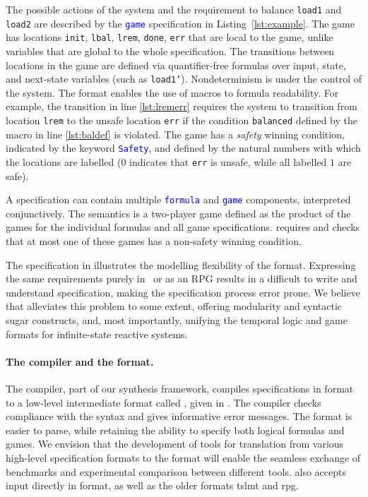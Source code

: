 \begin{example}
The possible actions of the system and the requirement to balance \texttt{load1} and \texttt{load2} are described by the 
\texttt{\textcolor{blue}{game}} specification in Listing~\ref{lst:example}. The game has locations \texttt{init}, \texttt{lbal}, \texttt{lrem}, \texttt{done}, \texttt{err} that are local to the game, unlike variables that are global to the whole specification.
The transitions between locations in the game are defined via  quantifier-free formulas over input, state, and next-state variables (such as \texttt{load1'}).  Nondeterminism is under the control of the system.  The \issy format enables the use of macros to formula readability. 
For example,  the transition in line \ref{lst:lremerr} requires the system to transition from location  \texttt{lrem} to the unsafe location \texttt{err} if the condition \texttt{balanced} defined by the macro in line \ref{lst:baldef} is violated. 
The game has a \emph{safety} winning condition,  indicated by the keyword \texttt{\textcolor{blue}{Safety}}, and defined by the natural numbers with which the locations are labelled ($0$ indicates that \texttt{err} is unsafe, while all  labelled $1$  are safe).
\end{example}

A specification can contain multiple \texttt{\textcolor{blue}{formula}} and \texttt{\textcolor{blue}{game}} components,  interpreted conjunctively.  The semantics is a two-player game defined as the product of the games for the individual formulas and all game specifications.  
\issy requires and checks that at most one of these games has a non-safety winning condition. 

The \issy specification in  illustrates the modelling flexibility of the format. Expressing the same requirements purely in \rpltl\ or as an RPG results in a difficult to write and understand specification,  making the specification process error prone.  We believe that \issy  alleviates this problem to some extent, offering modularity and syntactic sugar constructs, and,  most importantly, unifying the temporal logic and game formats for 
infinite-state reactive systems.

\vspace{-.3cm}
\paragraph{The \issy compiler and the \llissy format.}
The \issy compiler,  part of our synthesis framework,  compiles specifications in  \issy format to a low-level intermediate format called \llissy,  given in .
The compiler checks compliance with the syntax and gives informative error messages.
The \llissy format is easier to parse, while retaining the ability to specify both logical formulas and games. 
We envision that the development of tools  for translation from various high-level specification formats to the \llissy format will enable the seamless exchange of benchmarks and experimental comparison between different tools.
\issy also accepts input directly in \issy format, as well as the older formats  \textsf{tslmt} and \textsf{rpg}.


